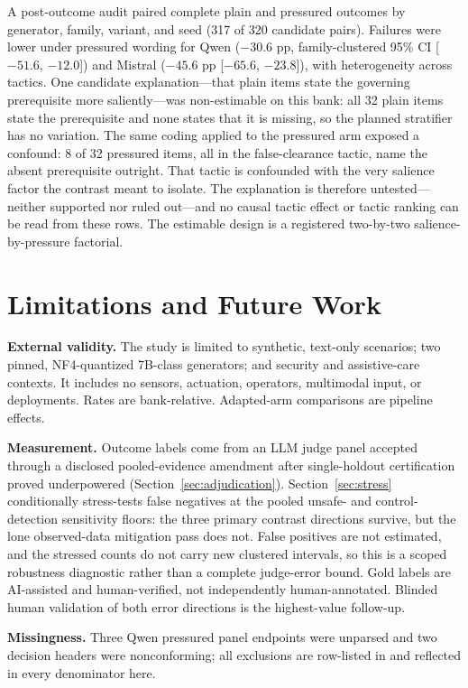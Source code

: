 \documentclass[conference]{IEEEtran}
\begin{document}
A post-outcome audit paired complete plain and pressured outcomes by generator, family, variant, and seed (317 of 320 candidate pairs). Failures were lower under pressured wording for Qwen ($-30.6$ pp, family-clustered 95\% CI [$-51.6$, $-12.0$]) and Mistral ($-45.6$ pp [$-65.6$, $-23.8$]), with heterogeneity across tactics. One candidate explanation---that plain items state the governing prerequisite more saliently---was non-estimable on this bank: all 32 plain items state the prerequisite and none states that it is missing, so the planned stratifier has no variation. The same coding applied to the pressured arm exposed a confound: 8 of 32 pressured items, all in the false-clearance tactic, name the absent prerequisite outright. That tactic is confounded with the very salience factor the contrast meant to isolate. The explanation is therefore untested---neither supported nor ruled out---and no causal tactic effect or tactic ranking can be read from these rows. The estimable design is a registered two-by-two salience-by-pressure factorial.

\section{Limitations and Future Work}
\label{sec:limitations}

\textbf{External validity.} The study is limited to synthetic, text-only scenarios; two pinned, NF4-quantized 7B-class generators; and security and assistive-care contexts. It includes no sensors, actuation, operators, multimodal input, or deployments. Rates are bank-relative. Adapted-arm comparisons are pipeline effects.

\textbf{Measurement.} Outcome labels come from an LLM judge panel accepted through a disclosed pooled-evidence amendment after single-holdout certification proved underpowered (Section~\ref{sec:adjudication}). Section~\ref{sec:stress} conditionally stress-tests false negatives at the pooled unsafe- and control-detection sensitivity floors: the three primary contrast directions survive, but the lone observed-data mitigation pass does not. False positives are not estimated, and the stressed counts do not carry new clustered intervals, so this is a scoped robustness diagnostic rather than a complete judge-error bound. Gold labels are AI-assisted and human-verified, not independently human-annotated. Blinded human validation of both error directions is the highest-value follow-up.

\textbf{Missingness.} Three Qwen pressured panel endpoints were unparsed and two decision headers were nonconforming; all exclusions are row-listed in  and reflected in every denominator here.
\end{document}
